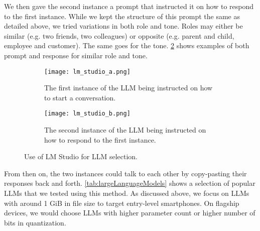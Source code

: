 We then gave the second instance a prompt that instructed it on how to respond to the first instance. While we kept the structure of this prompt the same as detailed above, we tried variations in both role and tone. Roles may either be similar (e.g. two friends, two colleagues) or opposite (e.g. parent and child, employee and customer). The same goes for the tone. \cref{fig:lmStudioB} shows examples of both prompt and response for similar role and tone.

\begin{figure}
	\captionsetup{width=\linewidth}

	\begin{subfigure}{\linewidth}
		\centering
		\texttt{[image: lm\_studio\_a.png]}
		\caption{The first instance of the \gls{LLM} being instructed on how to start a conversation.}
		\label{fig:lmStudioA}
	\end{subfigure}

	\begin{subfigure}{\linewidth}
		\centering
		\texttt{[image: lm\_studio\_b.png]}
		\caption{The second instance of the \gls{LLM} being instructed on how to respond to the first instance.}
		\label{fig:lmStudioB}
	\end{subfigure}

	\caption[LM Studio]{Use of LM Studio for \gls{LLM} selection.}
	\label{fig:lmStudio}
\end{figure}

From then on, the two instances could talk to each other by copy-pasting their responses back and forth. \cref{tab:largeLanguageModels} shows a selection of popular \glspl{LLM} that we tested using this method. As discussed above, we focus on \glspl{LLM} with around 1 GiB in file size to target entry-level smartphones. On flagship devices, we would choose \glspl{LLM} with higher parameter count or higher number of bits in quantization.

